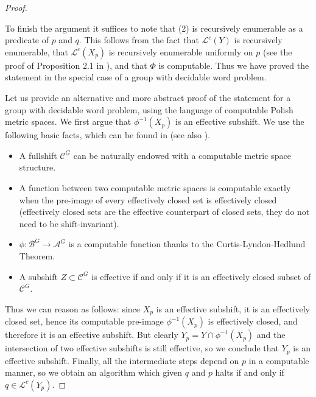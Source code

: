 \documentclass[a4paper,oneside]{amsart}
\renewcommand{\(}{\begin{dmath*}}
\renewcommand{\)}{\end{dmath*}}
\theoremstyle{definition}
\newcommand{\Le}{\mathcal{L}}
\newcommand{\Lep}{\mathscr{L}}
\newcommand{\A}{\mathcal{A}}
\newcommand{\B}{\mathcal{B}}
\begin{document}
\begin{proof}
\begin{enumerate}
\end{enumerate}
To finish the argument it suffices to note that (2) is recursively enumerable as a predicate of $p$ and $q$.  This follows from the fact that $\Le^c(Y)$ is recursively enumerable, that $\Le^c(X_p)$ is recursively enumerable uniformly on $p$ (see the proof of Proposition 2.1 in  \cite{aubrun_notion_2017}), and that $\Phi$ is computable. Thus we have proved the statement in the special case of a group with decidable word problem.


Let us provide an alternative and more abstract proof of the statement for a group with decidable word problem, using the language of computable Polish metric spaces. We first argue that $\phi^{-1}(X_p)$ is an effective subshift. We use the following basic facts, which can be found in \cite{barbieri_effective_2025} (see also \cite{barbieri_medvedev_2024,carrasco-vargas_subshifts_2024}).
\begin{itemize}
    \item A fullshift $\mathcal C^G$ can be naturally endowed with a computable metric space structure.
    
    \item A function between two computable metric spaces is computable exactly when the pre-image of every effectively closed set is effectively closed (effectively closed sets are the effective counterpart of closed sets, they do not need to be shift-invariant).
    \item $\phi\colon\B^G\to\A^G$ is a computable function thanks to the Curtis-Lyndon-Hedlund Theorem.
    \item A subshift $Z\subset \mathcal C^G$ is effective if and only if it is an effectively closed subset of $\mathcal C^G$.  
\end{itemize}
Thus we can reason as follows: since $X_p$ is an effective subshift, it is an effectively closed set, hence its computable pre-image $\phi^{-1}(X_p)$ is effectively closed, and therefore it is an effective subshift. But clearly $Y_p=Y\cap \phi^{-1}(X_p)$ and the intersection of two effective subshifts is still effective, so we conclude that $Y_p$ is an effective subshift. Finally, all the intermediate steps depend on $p$ in a computable manner, so we obtain an algorithm which given $q$ and $p$ halts if and only if $q\in \Lep^c(Y_p)$. 
\end{proof}
\end{document}
